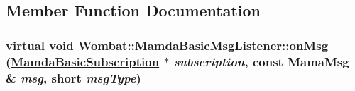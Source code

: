 \subsection{Member Function Documentation}
\hypertarget{classWombat_1_1MamdaBasicMsgListener_a0b8b6757cdac7ccd75e4609ff36a36a}{
\subsubsection[onMsg]{\setlength{\rightskip}{0pt plus 5cm}virtual void Wombat::Mamda\-Basic\-Msg\-Listener::on\-Msg (\hyperlink{classWombat_1_1MamdaBasicSubscription}{Mamda\-Basic\-Subscription} $\ast$ {\em subscription}, const Mama\-Msg \& {\em msg}, short {\em msg\-Type})}}
\label{classWombat_1_1MamdaBasicMsgListener_a0b8b6757cdac7ccd75e4609ff36a36a}


